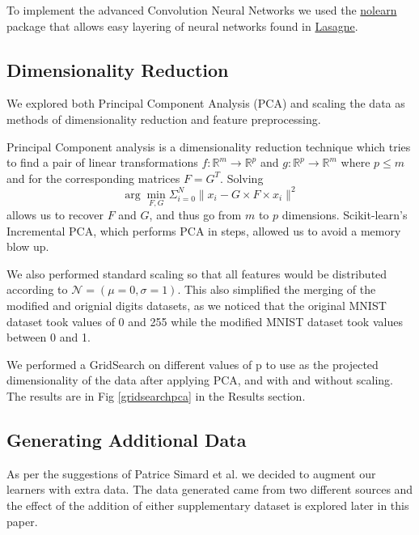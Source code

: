\documentclass[conference]{IEEEtran}
\begin{document}
To implement the advanced Convolution Neural Networks we used the \href{http://pythonhosted.org/nolearn/}{nolearn} package that allows easy layering of neural networks found in \href{http://lasagne.readthedocs.org/}{Lasagne}.

\subsection{Dimensionality Reduction}

We explored both Principal Component Analysis (PCA) and scaling the data as methods of dimensionality reduction and feature preprocessing. 

Principal Component analysis is a dimensionality reduction technique which tries to find a pair of linear transformations $f:\mathbb{R}^m\rightarrow\mathbb{R}^p$ and $g:\mathbb{R}^p\rightarrow\mathbb{R}^m$ where $p\leq m$ and for the corresponding matrices $F=G^T$. 
Solving
$$\arg\min_{F,G}\Sigma_{i=0}^N\|x_i-G\times F\times x_i\|^2$$
allows us to recover $F$ and $G$, and thus go from $m$ to $p$ dimensions. 
Scikit-learn's Incremental PCA, which performs PCA in steps, allowed us to avoid a memory blow up. 

We also performed standard scaling so that all features would be distributed according to $\mathcal{N}=\left(\mu=0,\sigma=1\right)$. This also simplified the merging of the modified and orignial digits datasets, as we noticed that the original MNIST dataset took values of 0 and 255 while the modified MNIST dataset took values between 0 and 1.

We performed a GridSearch on different values of p to use as the projected dimensionality of the data after applying PCA, and with and without scaling. The results are in Fig \ref{gridsearchpca} in the Results section.

\subsection{Generating Additional Data}

As per the suggestions of Patrice Simard et al. \cite{Simard} we decided to augment our learners with extra data. The data generated came from two different sources and the effect of the addition of either supplementary dataset is explored later in this paper.
\end{document}
